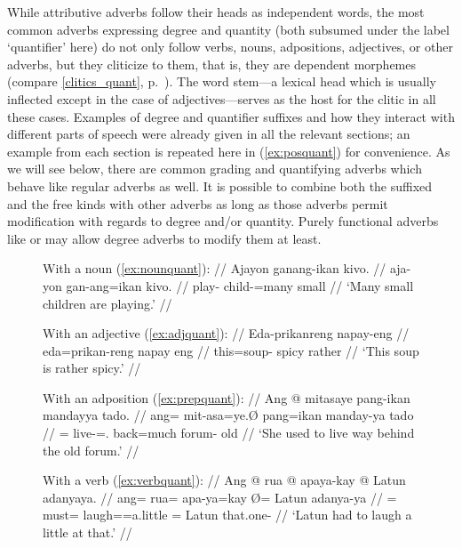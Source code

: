 While attributive adverbs follow their heads as independent words, the most
common adverbs expressing degree and quantity (both subsumed under the label
`quantifier' here) do not only follow verbs, nouns, adpositions, adjectives, or
other adverbs, but they cliticize to them, that is, they are dependent
morphemes (compare \autoref{clitics_quant}, p.~\pageref{clitics_quant}). The
word stem---a lexical head which is usually inflected except in the case of
adjectives---serves as the host for the clitic in all these cases. Examples of
degree and quantifier suffixes and how they interact with different parts of
speech were already given in all the relevant sections; an example from each
section is repeated here in (\ref{ex:posquant}) for convenience. As we will see
below, there are common grading and quantifying adverbs which behave like
regular adverbs as well. It is possible to combine both the suffixed and the
free kinds with other adverbs as long as those adverbs permit modification with
regards to degree and/or quantity. Purely functional adverbs like
 or  may allow
degree adverbs to modify them at least.

\begin{figure}[h]
\pex\label{ex:posquant}
\a\label{ex:nounquant2}\begingl
	\glpreamble With a noun (\ref{ex:nounquant}): //
	\gla Ajayon ganang-ikan kivo. //
	\glb aja-yon gan-ang=ikan kivo. //
	\glc play-\TsgN{} child-\Aarg{}=many small //
	\glft `Many small children are playing.' //
\endgl

\a\label{ex:adjquant2}\begingl
	\glpreamble With an adjective (\ref{ex:adjquant}): //
	\gla Eda-prikanreng napay-eng //
	\glb eda=prikan-reng {napay eng} //
	\glc this=soup-\AargI{} {spicy rather} //
	\glft `This soup is rather spicy.' //
\endgl

\a\label{ex:prepquant2}\begingl
	\glpreamble With an adposition (\ref{ex:prepquant}): //
	\gla Ang @ mitasaye pang-ikan mandayya tado. //
	\glb ang= mit-asa=ye.Ø pang=ikan manday-ya tado //
	\glc \AgtT{}= live-\Hab{}=\TsgF{}.\Top{} back=much forum-\Loc{} old //
	\glft `She used to live way behind the old forum.' //
\endgl

\a\label{ex:verbquant2}\begingl
	\glpreamble With a verb (\ref{ex:verbquant}): //
	\gla Ang @ rua @ apaya-kay {} @ Latun adanyaya. //
	\glb ang= rua= apa-ya=kay Ø= Latun adanya-ya //
	\glc \AgtT{}= must= laugh=\TsgM{}=a.little \Top{}= Latun that.one-\Loc{} //
	\glft `Latun had to laugh a little at that.' //
\endgl
\xe
\end{figure}


